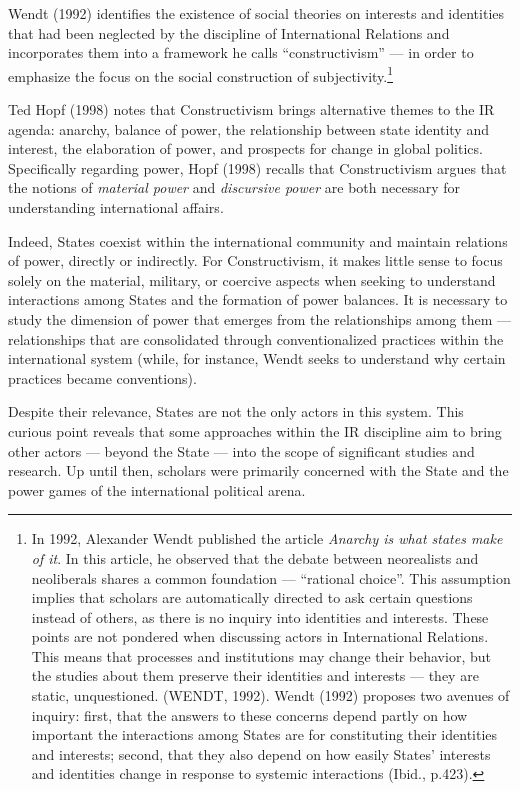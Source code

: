 Wendt (1992) identifies the existence of social theories on interests and identities that had been neglected by the discipline of International Relations and incorporates them into a framework he calls ``constructivism'' --- in order to emphasize the focus on the social construction of subjectivity.\footnote{In 1992, Alexander Wendt published the article \textit{Anarchy is what states make of it}. In this article, he observed that the debate between neorealists and neoliberals shares a common foundation --- ``rational choice''. This assumption implies that scholars are automatically directed to ask certain questions instead of others, as there is no inquiry into identities and interests. These points are not pondered when discussing actors in International Relations. This means that processes and institutions may change their behavior, but the studies about them preserve their identities and interests --- they are static, unquestioned. (WENDT, 1992). Wendt (1992) proposes two avenues of inquiry: first, that the answers to these concerns depend partly on how important the interactions among States are for constituting their identities and interests; second, that they also depend on how easily States' interests and identities change in response to systemic interactions (Ibid., p.423).} 

\begin{sloppypar}
Ted Hopf (1998) notes that Constructivism brings alternative themes to the IR agenda: anarchy, balance of power, the relationship between state identity and interest, the elaboration of power, and prospects for change in global politics. Specifically regarding power, Hopf (1998) recalls that Constructivism argues that the notions of \textit{material power} and \textit{discursive power} are both necessary for understanding international affairs.
\end{sloppypar}

Indeed, States coexist within the international community and maintain relations of power, directly or indirectly. For Constructivism, it makes little sense to focus solely on the material, military, or coercive aspects when seeking to understand interactions among States and the formation of power balances. It is necessary to study the dimension of power that emerges from the relationships among them --- relationships that are consolidated through conventionalized practices within the international system (while, for instance, Wendt seeks to understand why certain practices became conventions).

Despite their relevance, States are not the only actors in this system. This curious point reveals that some approaches within the IR discipline aim to bring other actors --- beyond the State --- into the scope of significant studies and research. Up until then, scholars were primarily concerned with the State and the power games of the international political arena.

